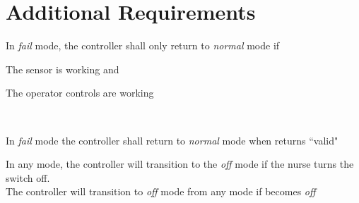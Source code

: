 \section{Additional Requirements}

{In \emph{fail} mode, the controller shall only return to \emph{normal} mode if
\begin{mylist}
\item The sensor is working and
\item The operator controls are working
\end{mylist}~}
{In \emph{fail} mode the controller shall return to \emph{normal} mode when  returns ``valid"~\\}
\label{R7}

{In any mode, the controller will transition to the \emph{off} mode if the nurse turns the switch off.~\\}
{The controller will transition to \emph{off} mode from any mode if  becomes \emph{off}\\~}
\label{R8}
